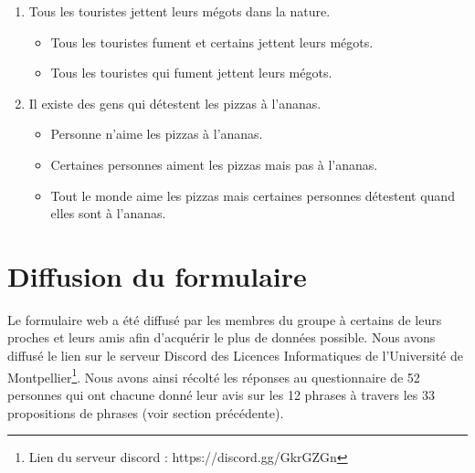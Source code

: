 \documentclass[11pt,letterpaper]{article}
\begin{document}
\begin{enumerate}
\vspace{7px}

\item Tous les touristes jettent leurs mégots dans la nature.
\begin{itemize}
    \item Tous les touristes fument et certains jettent leurs mégots.
    \item Tous les touristes qui fument jettent leurs mégots.
\end{itemize}

\vspace{7px}

\item Il existe des gens qui détestent les pizzas à l'ananas.
\begin{itemize}
    \item Personne n'aime les pizzas à l'ananas.
    \item Certaines personnes aiment les pizzas mais pas à l'ananas.
    \item Tout le monde aime les pizzas mais certaines personnes détestent quand elles sont à l'ananas.
\end{itemize}

\end{enumerate}

\section{Diffusion du formulaire}

Le formulaire web a été diffusé par les membres du groupe à certains de leurs proches et leurs amis afin d'acquérir le plus de données possible. Nous avons diffusé le lien sur le serveur Discord des Licences Informatiques de l'Université de Montpellier\footnote{Lien du serveur discord : https://discord.gg/GkrGZGn}. Nous avons ainsi récolté les réponses au questionnaire de 52 personnes qui ont chacune donné leur avis sur les 12 phrases à travers les 33 propositions de phrases (voir section précédente).

\vspace{10px}
\end{document}
